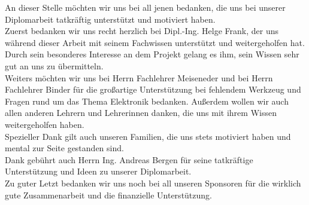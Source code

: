 
\begin{Danksagung}
An dieser Stelle möchten wir uns bei all jenen bedanken, die uns bei unserer Diplomarbeit tatkräftig unterstützt und motiviert haben. \\

Zuerst bedanken wir uns recht herzlich bei Dipl.-Ing. Helge Frank, der uns während dieser Arbeit mit seinem Fachwissen unterstützt und weitergeholfen hat. 
Durch sein besonderes Interesse an dem Projekt gelang es ihm, sein Wissen sehr gut an uns zu übermitteln. \\

Weiters möchten wir uns bei Herrn Fachlehrer Meiseneder und bei Herrn Fachlehrer Binder für die großartige Unterstützung bei fehlendem Werkzeug und Fragen 
rund um das Thema Elektronik bedanken. Außerdem wollen wir auch allen anderen Lehrern und Lehrerinnen danken, die uns mit ihrem Wissen weitergeholfen haben. \\

Spezieller Dank gilt auch unseren Familien, die uns stets motiviert haben und mental zur Seite gestanden sind. \\

Dank gebührt auch Herrn Ing. Andreas Bergen für seine tatkräftige Unterstützung und Ideen zu unserer Diplomarbeit. \\

Zu guter Letzt bedanken wir uns noch bei all unseren Sponsoren für die wirklich gute Zusammenarbeit und die finanzielle Unterstützung. \\
\end{Danksagung}
\newpage

